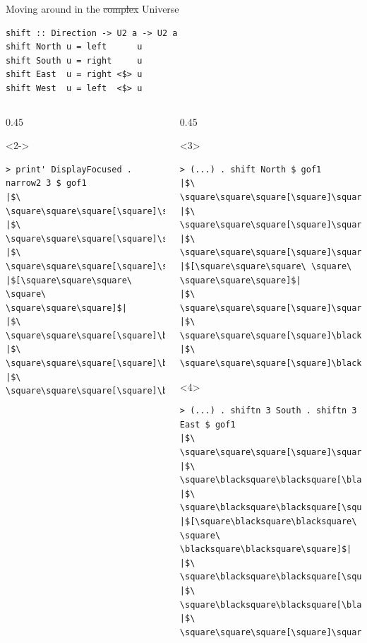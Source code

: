 \documentclass[presentation,aspectratio=169,smaller]{beamer}
\begin{document}
\begin{frame}[label={sec:orgf7facba},fragile]{Moving around in the \sout{complex} Universe}
 \begin{verbatim}
shift :: Direction -> U2 a -> U2 a
shift North u = left      u
shift South u = right     u
shift East  u = right <$> u
shift West  u = left  <$> u
\end{verbatim}

\begin{columns}
\begin{column}{0.45\columnwidth}
\begin{onlyenv}<2->
\begin{verbatim}
> print' DisplayFocused . narrow2 3 $ gof1
|$\ \square\square\square[\square]\square\square\square$|
|$\ \square\square\square[\square]\square\square\square$|
|$\ \square\square\square[\square]\square\square\square$|
|$[\square\square\square\ \square\ \square\square\square]$|
|$\ \square\square\square[\square]\blacksquare\blacksquare\blacksquare$|
|$\ \square\square\square[\square]\blacksquare\blacksquare\square$|
|$\ \square\square\square[\square]\blacksquare\blacksquare\square$|
\end{verbatim}
\end{onlyenv}
\end{column}

\begin{column}{0.45\columnwidth}
\begin{onlyenv}<3>
\begin{verbatim}
> (...) . shift North $ gof1
|$\ \square\square\square[\square]\square\square\square$|
|$\ \square\square\square[\square]\square\square\square$|
|$\ \square\square\square[\square]\square\square\square$|
|$[\square\square\square\ \square\ \square\square\square]$|
|$\ \square\square\square[\square]\square\square\square$|
|$\ \square\square\square[\square]\blacksquare\blacksquare\blacksquare$|
|$\ \square\square\square[\square]\blacksquare\blacksquare\square$|
\end{verbatim}
\end{onlyenv}

\begin{onlyenv}<4>
\begin{verbatim}
> (...) . shiftn 3 South . shiftn 3 East $ gof1
|$\ \square\square\square[\square]\square\square\square$|
|$\ \square\blacksquare\blacksquare[\blacksquare]\blacksquare\blacksquare\square$|
|$\ \square\blacksquare\blacksquare[\square]\blacksquare\blacksquare\square$|
|$[\square\blacksquare\blacksquare\ \square\ \blacksquare\blacksquare\square]$|
|$\ \square\blacksquare\blacksquare[\square]\blacksquare\blacksquare\square$|
|$\ \square\blacksquare\blacksquare[\blacksquare]\blacksquare\blacksquare\square$|
|$\ \square\square\square[\square]\square\square\square$|
\end{verbatim}
\end{onlyenv}
\end{column}
\end{columns}
\end{frame}
\end{document}
